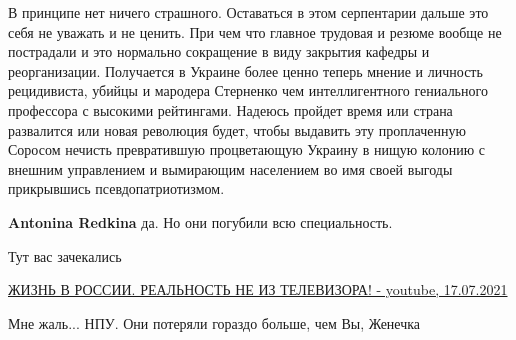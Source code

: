 \begin{itemize}
 

В принципе нет ничего страшного. Оставаться в этом серпентарии дальше это себя
не уважать и не ценить. При чем что главное трудовая и резюме вообще не
пострадали и это нормально сокращение в виду закрытия кафедры и реорганизации.
Получается в Украине более ценно теперь мнение и личность рецидивиста, убийцы и
мародера Стерненко чем интеллигентного гениального профессора с высокими
рейтингами. Надеюсь пройдет время или страна развалится или новая революция
будет, чтобы выдавить эту проплаченную Соросом нечисть превратившую
процветающую Украину в нищую колонию с внешним управлением и вымирающим
населением во имя своей выгоды прикрывшись псевдопатриотизмом.

\begin{itemize}
 
\textbf{Antonina Redkina} да. Но они погубили всю специальность.

 
Тут вас зачекались 

\href{https://youtu.be/mpMWEAGzN-o}{%
ЖИЗНЬ В РОССИИ. РЕАЛЬНОСТЬ НЕ ИЗ ТЕЛЕВИЗОРА! - youtube, 17.07.2021}
\end{itemize}

 
Мне жаль... НПУ. Они потеряли гораздо больше, чем Вы, Женечка

\begin{itemize}

 

\end{itemize}
\end{itemize}

